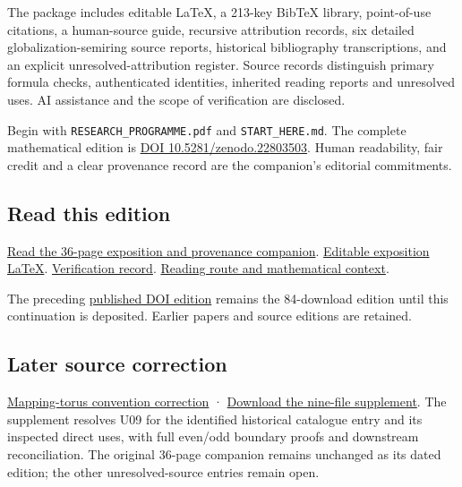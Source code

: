\documentclass[
]{article}
\begin{document}
The package includes editable LaTeX, a 213-key BibTeX library,
point-of-use citations, a human-source guide, recursive attribution
records, six detailed globalization-semiring source reports, historical
bibliography transcriptions, and an explicit unresolved-attribution
register. Source records distinguish primary formula checks,
authenticated identities, inherited reading reports and unresolved uses.
AI assistance and the scope of verification are disclosed.

Begin with \texttt{RESEARCH\_PROGRAMME.pdf} and \texttt{START\_HERE.md}.
The complete mathematical edition is
\href{https://doi.org/10.5281/zenodo.22803503}{DOI
10.5281/zenodo.22803503}. Human readability, fair credit and a clear
provenance record are the companion's editorial commitments.

\subsection{Read this edition}\label{read-this-edition-2}

\href{https://github.com/KokunoYumeto/zeta-function-research-reader/blob/main/workbenches/splitzero-tandem/continuations/20260917-exposition-provenance/RESEARCH_PROGRAMME.pdf}{Read
the 36-page exposition and provenance companion}.
\href{https://github.com/KokunoYumeto/zeta-function-research-reader/blob/main/workbenches/splitzero-tandem/continuations/20260917-exposition-provenance/RESEARCH_PROGRAMME.tex}{Editable
exposition LaTeX}.
\href{https://github.com/KokunoYumeto/zeta-function-research-reader/blob/main/workbenches/splitzero-tandem/continuations/20260917-exposition-provenance/COVERAGE.md}{Verification
record}.
\href{https://github.com/KokunoYumeto/zeta-function-research-reader/blob/main/workbenches/splitzero-tandem/continuations/20260917-exposition-provenance/START_HERE.md}{Reading
route and mathematical context}.

The preceding \href{https://zenodo.org/records/22803503}{published DOI
edition} remains the 84-download edition until this continuation is
deposited. Earlier papers and source editions are retained.

\subsection{Later source correction}\label{later-source-correction-1}

\href{https://github.com/KokunoYumeto/zeta-function-research-reader/blob/main/workbenches/splitzero-tandem/source-corrections/20260917-mapping-torus-conventions/README.md}{Mapping-torus
convention correction} ·
\href{https://raw.githubusercontent.com/KokunoYumeto/zeta-function-research-reader/main/workbenches/splitzero-tandem/source-corrections/20260917-mapping-torus-conventions/mapping-torus-convention-addendum-2026-09-17.zip}{Download
the nine-file supplement}. The supplement resolves U09 for the
identified historical catalogue entry and its inspected direct uses,
with full even/odd boundary proofs and downstream reconciliation. The
original 36-page companion remains unchanged as its dated edition; the
other unresolved-source entries remain open.
\end{document}

